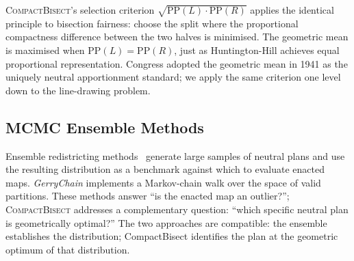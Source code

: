 \textsc{CompactBisect}'s selection criterion $\sqrt{\mathrm{PP}(L) \cdot
\mathrm{PP}(R)}$ applies the identical principle to bisection fairness: choose
the split where the proportional compactness difference between the two halves
is minimised. The geometric mean is maximised when $\mathrm{PP}(L) =
\mathrm{PP}(R)$, just as Huntington-Hill achieves equal proportional
representation. Congress adopted the geometric mean in 1941 as the uniquely
neutral apportionment standard; we apply the same criterion one level down to
the line-drawing problem.

\subsection{MCMC Ensemble Methods}

Ensemble redistricting methods~\citep{chikina2017assessing, herschlag2020quantifying}
generate large samples of neutral plans and use the resulting distribution as
a benchmark against which to evaluate enacted maps. \emph{GerryChain}
\citep{duchin2019gerrychain} implements a Markov-chain walk over the space of
valid partitions. These methods answer ``is the enacted map an outlier?'';
\textsc{CompactBisect} addresses a complementary question: ``which specific
neutral plan is geometrically optimal?'' The two approaches are compatible:
the ensemble establishes the distribution; CompactBisect identifies the plan
at the geometric optimum of that distribution.
